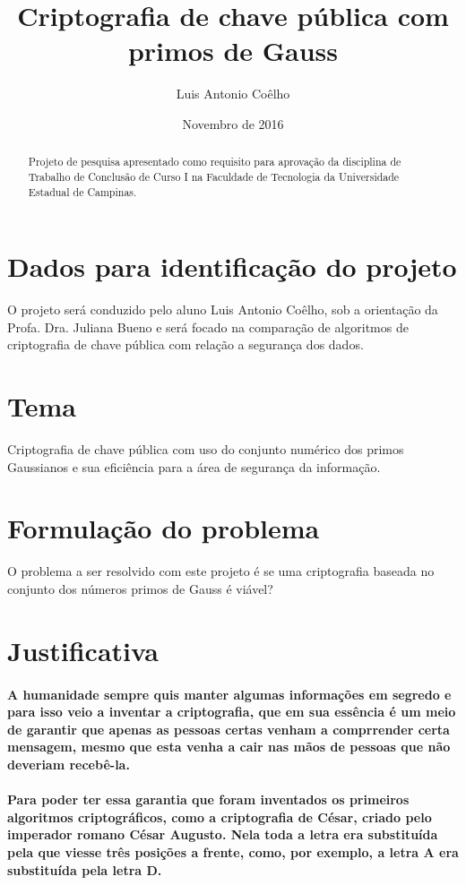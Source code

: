 \documentclass{article}
\title{Criptografia de chave pública com primos de Gauss}
\author{Luis Antonio Coêlho}
\date{Novembro de 2016}
\begin{document}
	
	\maketitle
	\begin{abstract}
		Projeto de pesquisa apresentado como requisito para aprovação da disciplina de Trabalho de Conclusão de Curso I na Faculdade de Tecnologia da Universidade Estadual de Campinas.
	\end{abstract}
	\tableofcontents
	
	\section{Dados para identificação do projeto}
	O projeto será conduzido pelo aluno Luis Antonio Coêlho, sob a orientação da Profa. Dra. Juliana Bueno e será focado na comparação de algoritmos de criptografia de chave pública com relação a segurança dos dados.
	\section{Tema}
	Criptografia de chave pública com uso do conjunto numérico dos primos Gaussianos e sua eficiência para a área de segurança da informação.
	\section{Formulação do problema}
	O problema a ser resolvido com este projeto é se uma criptografia baseada no conjunto dos números primos de Gauss é viável?
	\section{Justificativa}
	\paragraph{
		A humanidade sempre quis manter algumas informações em segredo e para isso veio a inventar a criptografia, que em sua essência é um meio de garantir que apenas as pessoas certas venham a comprrender certa mensagem, mesmo que esta venha a cair nas mãos de pessoas que não deveriam recebê-la.
	}
	\paragraph{
		Para poder ter essa garantia que foram inventados os primeiros algoritmos criptográficos, como a criptografia de César, criado pelo imperador romano César Augusto. Nela toda a letra era substituída pela que viesse três posições a frente, como,  por exemplo, a letra A era substituída pela letra D.
	}
\end{document}
